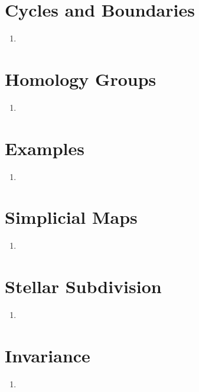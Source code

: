 \documentclass{book}
\begin{document}
\section{Cycles and Boundaries}
\begin{enumerate}[(1)]
    \item 
\end{enumerate}

\section{Homology Groups}
\begin{enumerate}[(1)]
    \item 
\end{enumerate}

\section{Examples}
\begin{enumerate}[(1)]
    \item 
\end{enumerate}

\section{Simplicial Maps}
\begin{enumerate}[(1)]
    \item 
\end{enumerate}

\section{Stellar Subdivision}
\begin{enumerate}[(1)]
    \item 
\end{enumerate}

\section{Invariance}
\begin{enumerate}[(1)]
    \item 
\end{enumerate}


\nocite{*}


\end{document}
